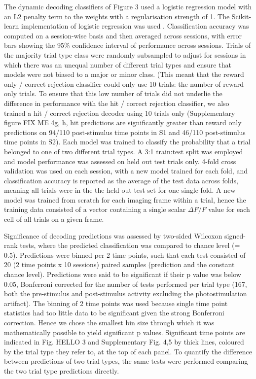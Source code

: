 The dynamic decoding classifiers of Figure 3 used a logistic regression model with an L2 penalty term to the weights with a regularisation strength of 1. The Scikit-learn implementation of logistic regression was used \cite{pedregosa_scikit-learn_2012}. Classification accuracy was computed on a session-wise basis and then averaged across sessions, with error bars showing the 95\% confidence interval of performance across sessions. Trials of the majority trial type class were randomly subsampled to adjust for sessions in which there was an unequal number of different trial types and ensure that models were not biased to a major or minor class. (This meant that the reward only / correct rejection classifier could only use 10 trials: the number of reward only trials. To ensure that this low number of trials did not underlie the difference in performance with the hit / correct rejection classifier, we also trained a hit / correct rejection decoder using 10 trials only (Supplementary figure FIX ME 4g, h, hit predictions are significantly greater than reward only predictions on 94/110 post-stimulus time points in S1 and 46/110 post-stimulus time points in S2). Each model was trained to classify the probability that a trial belonged to one of two different trial types. A 3:1 train:test split was employed and model performance was assessed on held out test trials only. 4-fold cross validation was used on each session, with a new model trained for each fold, and classification accuracy is reported as the average of the test data across folds, meaning all trials were in the the held-out test set for one single fold. A new model was trained from scratch for each imaging frame within a trial, hence the training data consisted of a vector containing a single scalar $\Delta F/F$ value for each cell of all trials on a given frame.

Significance of decoding predictions was assessed by two-sided Wilcoxon signed-rank tests, where the predicted classification was compared to chance level (= 0.5). Predictions were binned per 2 time points, such that each test consisted of 20 (2 time points x 10 sessions) paired samples (prediction and the constant chance level). Predictions were said to be significant if their p value was below 0.05, Bonferroni corrected for the number of tests performed per trial type (167, both the pre-stimulus and post-stimulus activity excluding the photostimulation artifact). The binning of 2 time points was used because single time point statistics had too little data to be significant given the strong Bonferroni correction. Hence we chose the smallest bin size through which it was mathematically possible to yield significant p values. Significant time points are indicated in Fig. HELLO 3 and Supplementary Fig. 4,5 by thick lines, coloured by the trial type they refer to, at the top of each panel. To quantify the difference between predictions of two trial types, the same tests were performed comparing the two trial type predictions directly.


